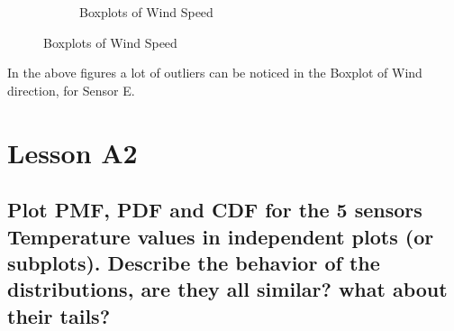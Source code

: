 \documentclass[a4paper,12pt]{article} %
\begin{document}
\begin{figure}[H]
\begin{subfigure}[b]{0.4\linewidth}
	\caption{Boxplots of Wind Speed}
\end{subfigure}
\end{figure}

In the above figures a lot of outliers can be noticed in the Boxplot of Wind direction, for Sensor E.

\section{ Lesson A2}

\subsection{Plot PMF, PDF and CDF for the 5 sensors Temperature values in independent plots (or subplots). Describe the behavior of the distributions, are they all similar? what about their tails?}
\end{document}
